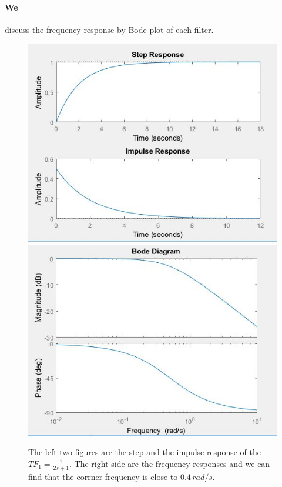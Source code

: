 \documentclass[12pt,a4paper]{article}
\begin{document}
			\paragraph{We} discuss the frequency response by Bode plot of each filter.\\
			\begin{figure}[H]
				\includegraphics[scale=0.58]{Problem2a}
				\includegraphics[scale=0.6]{Problem2b}
				\caption[Properties of the fisrt filter]{The left two figures are the step and the impulse response of the $TF_{1}=\frac{1}{2s+1}$. The right side are the frequency responses and we can find that the corrner frequency is close to $0.4\, rad/s.$ }
			\end{figure}
\end{document}
